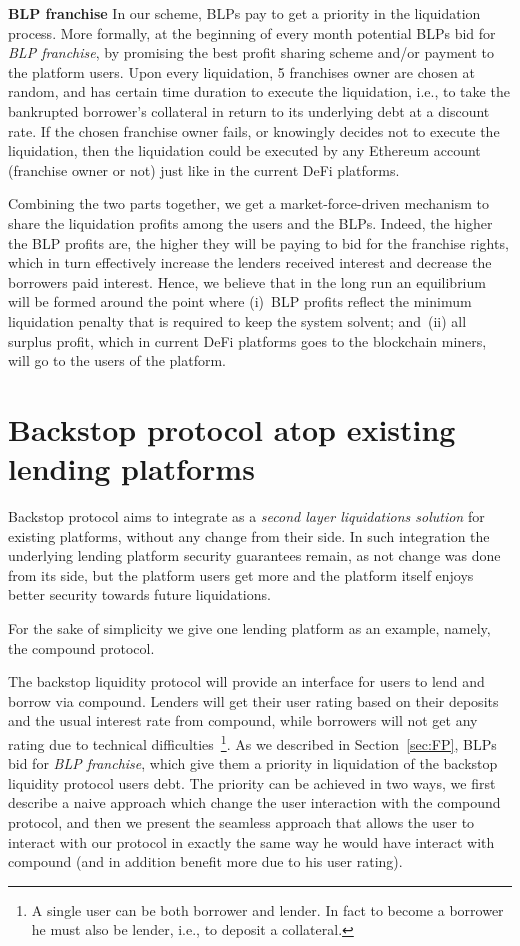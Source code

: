 \documentclass{article}
\begin{document}
\noindent\textbf{BLP franchise}
In our scheme, BLPs pay to get a priority in the liquidation process.
More formally, at the beginning of every month potential BLPs bid for \emph{BLP franchise}, by promising the best profit sharing scheme and/or payment to the platform users.
Upon every liquidation, 5 franchises owner are chosen at random, and has certain time duration to execute the liquidation, i.e., to take the bankrupted borrower's collateral in return to its underlying debt at a discount rate.
If the chosen franchise owner fails, or knowingly decides not to execute the liquidation, then the liquidation could be executed by any Ethereum account (franchise owner or not) just like in the current DeFi platforms.


Combining the two parts together, we get a market-force-driven mechanism to share the liquidation profits among the users and the BLPs.
Indeed, the higher the BLP profits are, the higher they will be paying to bid for the franchise rights, which in turn effectively increase the lenders received interest and decrease the borrowers paid interest.
Hence, we believe that in the long run an equilibrium will be formed around the point where (i)~BLP profits reflect the minimum liquidation penalty that is required to keep the system solvent; and~(ii) all surplus profit, which in current DeFi platforms goes to the blockchain miners, will go to the users of the platform.

\section{Backstop protocol atop existing lending platforms}\label{sec:boot}
Backstop protocol aims to integrate as a \emph{second layer liquidations solution} for existing platforms, without any change from their side.
In such integration the underlying lending platform security guarantees remain, as not change was done from its side, but the platform users get more and the platform itself enjoys better security towards future liquidations.

For the sake of simplicity we give one lending platform as an example, namely, the compound protocol.

The backstop liquidity protocol will provide an interface for users to lend and borrow via compound. Lenders will get their user rating based on their deposits and the usual interest rate from compound, while borrowers will not get any rating due to technical difficulties~\footnote{A single user can be both borrower and lender. In fact to become a borrower he must also be lender, i.e., to deposit a collateral.}.
As we described in Section~\ref{sec:FP}, BLPs bid for \emph{BLP franchise}, which give them a priority in liquidation of the backstop liquidity protocol users debt.
The priority can be achieved in two ways, we first describe a naive approach which change the user interaction with the compound protocol, and then we present the seamless approach that allows the user to interact with our protocol in exactly the same way he would have interact with compound (and in addition benefit more due to his user rating).
\end{document}

